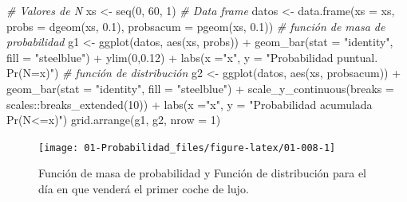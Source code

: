 \documentclass[
]{book}
\newenvironment{Shaded}{\begin{snugshade}}{\end{snugshade}}
\newcommand{\AttributeTok}[1]{\textcolor[rgb]{0.77,0.63,0.00}{#1}}
\newcommand{\CommentTok}[1]{\textcolor[rgb]{0.56,0.35,0.01}{\textit{#1}}}
\newcommand{\DecValTok}[1]{\textcolor[rgb]{0.00,0.00,0.81}{#1}}
\newcommand{\FloatTok}[1]{\textcolor[rgb]{0.00,0.00,0.81}{#1}}
\newcommand{\FunctionTok}[1]{\textcolor[rgb]{0.00,0.00,0.00}{#1}}
\newcommand{\NormalTok}[1]{#1}
\newcommand{\OtherTok}[1]{\textcolor[rgb]{0.56,0.35,0.01}{#1}}
\newcommand{\SpecialCharTok}[1]{\textcolor[rgb]{0.00,0.00,0.00}{#1}}
\newcommand{\StringTok}[1]{\textcolor[rgb]{0.31,0.60,0.02}{#1}}
\theoremstyle{definition}
\theoremstyle{definition}
\theoremstyle{definition}
\theoremstyle{definition}
\theoremstyle{remark}
\begin{document}
\begin{Shaded}
\begin{Highlighting}[]
\CommentTok{\# Valores de N}
\NormalTok{xs }\OtherTok{\textless{}{-}} \FunctionTok{seq}\NormalTok{(}\DecValTok{0}\NormalTok{, }\DecValTok{60}\NormalTok{, }\DecValTok{1}\NormalTok{)}
\CommentTok{\# Data frame}
\NormalTok{datos }\OtherTok{\textless{}{-}} \FunctionTok{data.frame}\NormalTok{(}\AttributeTok{xs =}\NormalTok{ xs, }\AttributeTok{probs =} \FunctionTok{dgeom}\NormalTok{(xs, }\FloatTok{0.1}\NormalTok{), }
                    \AttributeTok{probsacum =} \FunctionTok{pgeom}\NormalTok{(xs, }\FloatTok{0.1}\NormalTok{))}
\CommentTok{\# función de masa de probabilidad}
\NormalTok{g1 }\OtherTok{\textless{}{-}} \FunctionTok{ggplot}\NormalTok{(datos, }\FunctionTok{aes}\NormalTok{(xs, probs)) }\SpecialCharTok{+} 
  \FunctionTok{geom\_bar}\NormalTok{(}\AttributeTok{stat =} \StringTok{"identity"}\NormalTok{, }\AttributeTok{fill =} \StringTok{"steelblue"}\NormalTok{) }\SpecialCharTok{+}
  \FunctionTok{ylim}\NormalTok{(}\DecValTok{0}\NormalTok{,}\FloatTok{0.12}\NormalTok{) }\SpecialCharTok{+}
  \FunctionTok{labs}\NormalTok{(}\AttributeTok{x =}\StringTok{"x"}\NormalTok{, }\AttributeTok{y =} \StringTok{"Probabilidad puntual. Pr(N=x)"}\NormalTok{)}
\CommentTok{\# función de distribución}
\NormalTok{g2 }\OtherTok{\textless{}{-}} \FunctionTok{ggplot}\NormalTok{(datos, }\FunctionTok{aes}\NormalTok{(xs, probsacum)) }\SpecialCharTok{+} 
  \FunctionTok{geom\_bar}\NormalTok{(}\AttributeTok{stat =} \StringTok{"identity"}\NormalTok{, }\AttributeTok{fill =} \StringTok{"steelblue"}\NormalTok{) }\SpecialCharTok{+}
  \FunctionTok{scale\_y\_continuous}\NormalTok{(}\AttributeTok{breaks =}\NormalTok{ scales}\SpecialCharTok{::}\FunctionTok{breaks\_extended}\NormalTok{(}\DecValTok{10}\NormalTok{)) }\SpecialCharTok{+}
  \FunctionTok{labs}\NormalTok{(}\AttributeTok{x =}\StringTok{"x"}\NormalTok{, }\AttributeTok{y =} \StringTok{"Probabilidad acumulada Pr(N\textless{}=x)"}\NormalTok{)}
\FunctionTok{grid.arrange}\NormalTok{(g1, g2, }\AttributeTok{nrow =} \DecValTok{1}\NormalTok{)}
\end{Highlighting}
\end{Shaded}

\begin{figure}

{\centering \texttt{[image: 01-Probabilidad\_files/figure-latex/01-008-1]} 

}

\caption{Función de masa de probabilidad y Función de distribución para el día en que venderá el primer coche de lujo.}\label{fig:01-008}
\end{figure}
\end{document}
